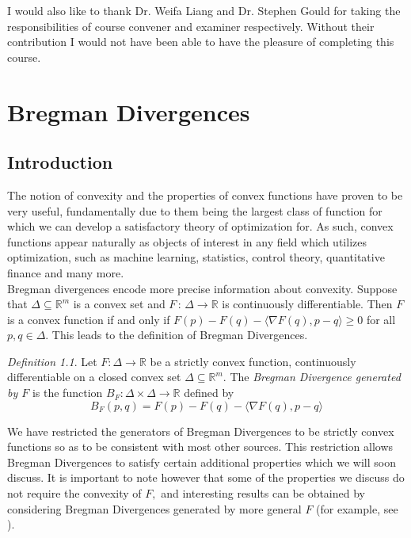 \documentclass[BSc]{usydthesis}
\numberwithin{equation}{chapter}
\theoremstyle{remark}
\newtheorem{Definition}[equation]{Definition}
\newcommand{\map}[2]{\,{:}\,#1\!\longrightarrow\!#2}
\begin{document}
I would also like to thank Dr. Weifa Liang and Dr. Stephen Gould for taking the responsibilities of course convener and examiner respectively. Without their contribution I would not have been able to have the pleasure of completing this course. 
\tableofcontents    %

\newpage\setcounter{page}{1}

\chapter{Bregman Divergences}
\section{Introduction}
The notion of convexity and the properties of convex functions have proven to be very useful, fundamentally due to them being the largest class of function for which we can develop a satisfactory theory of optimization for. As such, convex functions appear naturally as objects of interest in any field which utilizes optimization, such as machine learning, statistics, control theory, quantitative finance and many more. \\

Bregman divergences encode more precise information about convexity. Suppose that $\Delta\subseteq \mathbb{R}^m$ is a convex set and $F \map{\Delta}{\mathbb{R}}$ is continuously differentiable. Then $F$ is a convex function if and only if $ F(p) - F(q) - \langle \nabla F(q), p-q \rangle \geq 0$ for all $p,q \in \Delta.$ This leads to the definition of Bregman Divergences.

\begin{Definition}
 Let $F: \Delta \to \mathbb{R}$ be a strictly convex function, continuously differentiable on a closed convex set $\Delta\subseteq \mathbb{R}^m.$ The {\em Bregman Divergence generated by $F$} is the function $B_F : \Delta \times \Delta \to \mathbb{R}$ defined by $$ B_F(p,q) = F(p) - F(q) - \langle \nabla F(q), p-q \rangle$$ 
\end{Definition}

We have restricted the generators of Bregman Divergences to be strictly convex functions so as to be consistent with most other sources. This restriction allows Bregman Divergences to satisfy certain additional properties which we will soon discuss. It is important to note however that some of the properties we discuss do not require the convexity of $F,$ and interesting results can be obtained by considering Bregman Divergences generated by more general $F$ (for example, see \cite{Cheng}).  
\end{document}
